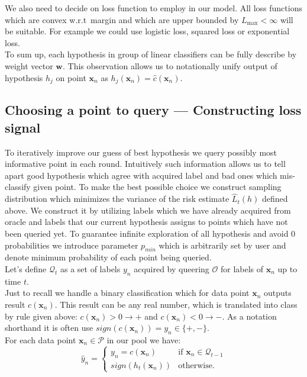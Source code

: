 \documentclass[12pt, a4paper, pdflatex]{report}
\begin{document}
We also need to decide on loss function to employ in our model. All loss functions which are convex w.r.t\ margin and which are upper bounded by $L_{\text{max}} < \infty$ will be suitable. For example we could use logistic loss, squared loss or exponential loss.\\

To sum up, each hypothesis in group of linear classifiers can be fully describe by weight vector $\mathbf{w}$. This observation allows us to notationally unify output of hypothesis $h_j$ on point $\mathbf{x}_n$ as $h_j(\mathbf{x}_n) = \hat{c}(\mathbf{x}_n)$.\\


\subsection{Choosing a point to query --- Constructing loss signal\label{sec:pointtoquery}}
To iteratively improve our guess of best hypothesis we query possibly most informative point in each round. Intuitively such information allows us to tell apart good hypothesis which agree with acquired label and bad ones which mis-classify given point. To make the best possible choice we construct sampling distribution which minimizes the variance of the risk estimate $\hat{L}_t(h)$ defined above. We construct it by utilizing labels which we have already acquired from oracle and labels that our current hypothesis assigns to points which have not been queried yet. To guarantee infinite exploration of all hypothesis and avoid $0$ probabilities we introduce parameter $p_{min}$ which is arbitrarily set by user and denote minimum probability of each point being queried.\\

Let's define $\mathscr{Q}_t$ as a set of labels $y_n$ acquired by queering $\mathscr{O}$ for labels of $\mathbf{x}_n$ up to time $t$.\\
Just to recall we handle a binary classification which for data point $\mathbf{x}_n$ outputs result $c(\mathbf{x}_n)$. This result can be any real number, which is translated into class by rule given above: $c(\mathbf{x}_n) > 0 \rightarrow +$ and $c(\mathbf{x}_n) < 0 \rightarrow -$. As a notation shorthand it is often use $\textit{sign}(c(\mathbf{x}_n)) = y_n \in \{+, -\}$.\\

For each data point $\mathbf{x}_n \in \mathscr{P}$ in our pool we have:
$$
\hat{y}_n = \begin{cases}
                                    y_n = c(\mathbf{x}_n)  & \text{if } \mathbf{x}_n \in \mathscr{Q}_{t-1} \\
                                    \textit{sign}(h_t(\mathbf{x}_n)) & \text{otherwise.}
                                  \end{cases} 
$$
\end{document}
